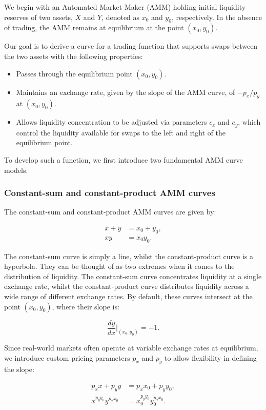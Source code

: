 \documentclass{article}
\begin{document}
We begin with an Automated Market Maker (AMM) holding initial liquidity reserves of two assets, $X$ and $Y$, denoted as $x_0$ and $y_0$, respectively. In the absence of trading, the AMM remains at equilibrium at the point $(x_0, y_0)$. 

Our goal is to derive a curve for a trading function that supports swaps between the two assets with the following properties:

\begin{itemize}
    \item Passes through the equilibrium point $(x_0, y_0)$.
    \item Maintains an exchange rate, given by the slope of the AMM curve, of $-p_x / p_y$ at $(x_0, y_0)$.
    \item Allows liquidity concentration to be adjusted via parameters $c_x$ and $c_y$, which control the liquidity available for swaps to the left and right of the equilibrium point.
\end{itemize}

To develop such a function, we first introduce two fundamental AMM curve models.

\subsubsection{Constant-sum and constant-product AMM curves}

The constant-sum and constant-product AMM curves are given by:

\begin{align}
    x + y &= x_0 + y_0, \\
    xy &= x_0 y_0.
\end{align}

The constant-sum curve is simply a line, whilst the constant-product curve is a hyperbola. They can be thought of as two extremes when it comes to the distribution of liquidity. The constant-sum curve concentrates liquidity at a single exchange rate, whilst the constant-product curve distributes liquidity across a wide range of different exchange rates. By default, these curves intersect at the point $(x_0, y_0)$, where their slope is:

\[
\frac{dy}{dx} \Big|_{(x_0, y_0)} = -1.
\]

Since real-world markets often operate at variable exchange rates at equilibrium, we introduce custom pricing parameters $p_x$ and $p_y$ to allow flexibility in defining the slope:

\begin{align}
    p_x x + p_y y &= p_x x_0 + p_y y_0, \\
    \label{eq:exponential-form}
    x^{p_y y_0} y^{p_x x_0} &= x_0^{p_y y_0} y_0^{p_x x_0}.
\end{align}
\end{document}
